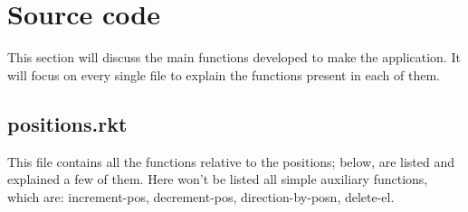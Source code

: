 \documentclass{article}
\begin{document}
	\pagebreak
	
	\section{Source code}
	This section will discuss the main functions developed to make the application. It will focus on every single file to explain the functions present in each of them.
	
	\subsection{positions.rkt}
	This file contains all the functions relative to the positions; below, are listed and explained a few of them.
	Here won't be listed all simple auxiliary functions, which are: increment-pos, decrement-pos, direction-by-posn, delete-el.
\end{document}
